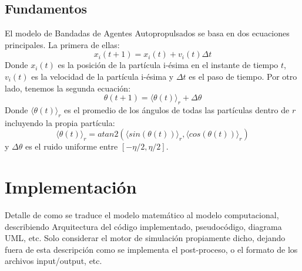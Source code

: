 \documentclass[11pt]{article}
\begin{document}
        \subsection{Fundamentos}

            El modelo de Bandadas de Agentes Autopropulsados se basa en dos ecuaciones principales. La primera de ellas:
            \begin{equation}
                x_i(t+1) = x_i(t) + v_i(t) \Delta t
            \end{equation}
            Donde $x_i(t)$ es la posición de la partícula i-ésima en el instante de tiempo $t$, $v_i(t)$ es la velocidad de la partícula i-ésima
            y $\Delta t$ es el paso de tiempo.
            Por otro lado, tenemos la segunda ecuación:
            \begin{equation}
                \theta(t+1) = \langle \theta(t) \rangle_r+ \Delta \theta
            \end{equation}
            Donde $\langle \theta(t) \rangle_r$ es el promedio de los ángulos de todas las partículas dentro de $r$ incluyendo la propia
            partícula:
            \begin{equation}
                \langle \theta(t) \rangle_r = atan2(\langle sin(\theta(t)) \rangle_r, \langle cos(\theta(t)) \rangle_r)
            \end{equation}
            y $\Delta \theta$ es el ruido uniforme entre $[-\eta/2, \eta/2]$.

    \newpage

    \section{Implementación}
    Detalle de como se traduce el modelo matemático al modelo computacional,
    describiendo Arquitectura del código implementado, pseudocódigo, diagrama UML, etc.
    Solo considerar el motor de simulación propiamente dicho, dejando fuera de esta descripción
    como se implementa el post-proceso, o el formato de los archivos input/output, etc.

    \newpage
\end{document}
